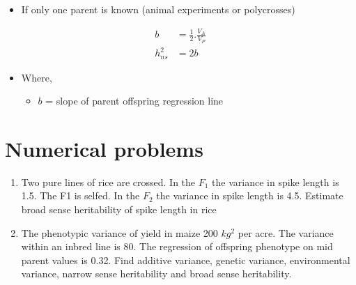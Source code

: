 \documentclass[11pt,dvipsnames,ignorenonframetext,aspectratio=169]{beamer}
\providecommand{\tightlist}{%
  \setlength{\itemsep}{0pt}\setlength{\parskip}{0pt}}
\begin{document}
\begin{frame}{}
\protect\hypertarget{section-21}{}
\begin{itemize}
\tightlist
\item
  If only one parent is known (animal experiments or polycrosses)
\end{itemize}

\[
\begin{aligned} 
b &= \frac{1}{2}.\frac{V_A}{V_P} \\ 
h_{ns}^2 &= 2b 
\end{aligned}
\]

\begin{itemize}
\tightlist
\item
  Where,

  \begin{itemize}
  \tightlist
  \item
    \(b\) = slope of parent offspring regression line
  \end{itemize}
\end{itemize}
\end{frame}

\hypertarget{numerical-problems}{%
\section{Numerical problems}\label{numerical-problems}}

\begin{frame}{}
\protect\hypertarget{section-22}{}
\begin{enumerate}
\item
  Two pure lines of rice are crossed. In the \(F_1\) the variance in
  spike length is 1.5. The F1 is selfed. In the \(F_2\) the variance in
  spike length is 4.5. Estimate broad sense heritability of spike length
  in rice
\item
  The phenotypic variance of yield in maize 200 \(kg^2\) per acre. The
  variance within an inbred line is 80. The regression of offspring
  phenotype on mid parent values is 0.32. Find additive variance,
  genetic variance, environmental variance, narrow sense heritability
  and broad sense heritability.
\end{enumerate}
\end{frame}
\end{document}
